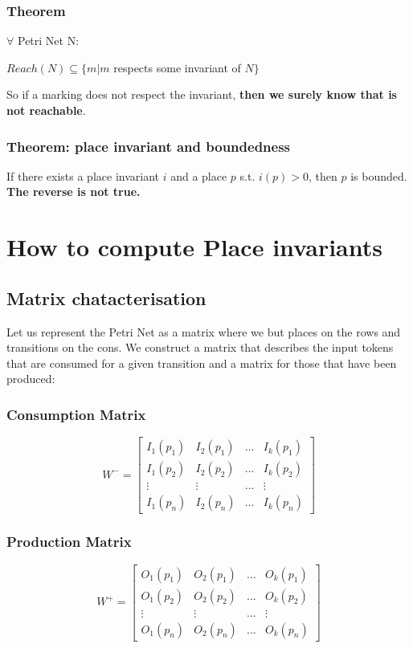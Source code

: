 \subsubsection{Theorem}
$\forall$ Petri Net N:
\begin{center}
    $Reach (N) \subseteq \{ m | m $ respects some invariant of $N\}$
\end{center}

So if a marking does not respect the invariant, \textbf{then we surely know that is not reachable}.

\subsubsection{Theorem: place invariant and boundedness}
If there exists a place invariant $i$ and a place $p$ s.t. $i(p) > 0$, then $p$ is bounded. \textbf{The reverse is not true.}

\section{How to compute Place invariants}
\subsection{Matrix chatacterisation}
Let us represent the Petri Net as a matrix where we but places on the rows and transitions on the cons. We construct a matrix that describes the input tokens that are consumed for a given transition and a matrix for those that have been produced:

\subsubsection{Consumption Matrix}
\[
W^{-} =
\begin{bmatrix}
    I_{1}(p_{1}) & I_{2}(p_{1}) & ... & I_{k}(p_{1}) \\
    I_{1}(p_{2}) & I_{2}(p_{2}) & ... & I_{k}(p_{2}) \\
    \vdots & \vdots & ... & \vdots \\
    I_{1}(p_{n}) & I_{2}(p_{n}) & ... & I_{k}(p_{n})
\end{bmatrix}
\]

\subsubsection{Production Matrix}
\[
W^{+} =
\begin{bmatrix}
    O_{1}(p_{1}) & O_{2}(p_{1}) & ... & O_{k}(p_{1}) \\
    O_{1}(p_{2}) & O_{2}(p_{2}) & ... & O_{k}(p_{2}) \\
    \vdots & \vdots & ... & \vdots \\
    O_{1}(p_{n}) & O_{2}(p_{n}) & ... & O_{k}(p_{n})
\end{bmatrix}
\]

